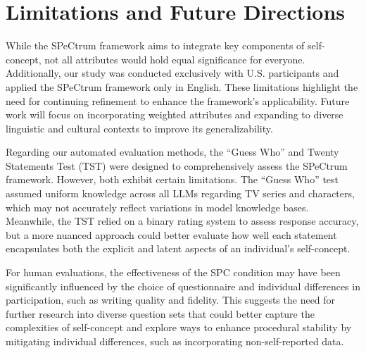 \section{Limitations and Future Directions}
While the SPeCtrum framework aims to integrate key components of self-concept, not all attributes would hold equal significance for everyone. Additionally, our study was conducted exclusively with U.S. participants and applied the SPeCtrum framework only in English. These limitations highlight the need for continuing refinement to enhance the framework’s applicability. Future work will focus on incorporating weighted attributes and expanding to diverse linguistic and cultural contexts to improve its generalizability.

Regarding our automated evaluation methods, the ``Guess Who'' and Twenty Statements Test (TST) were designed to comprehensively assess the SPeCtrum framework. However, both exhibit certain limitations. The ``Guess Who'' test assumed uniform knowledge across all LLMs regarding TV series and characters, which may not accurately reflect variations in model knowledge bases. Meanwhile, the TST relied on a binary rating system to assess response accuracy, but a more nuanced approach could better evaluate how well each statement encapsulates both the explicit and latent aspects of an individual's self-concept.

For human evaluations, the effectiveness of the SPC condition may have been significantly influenced by the choice of questionnaire and individual differences in participation, such as writing quality and fidelity. This suggests the need for further research into diverse question sets that could better capture the complexities of self-concept and explore ways to enhance procedural stability by mitigating individual differences, such as incorporating non-self-reported data.
